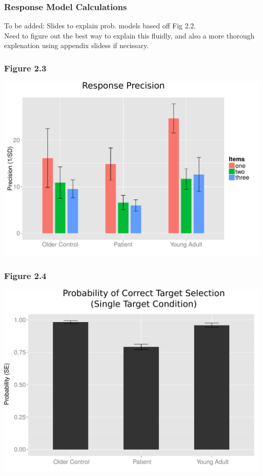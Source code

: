 \documentclass{beamer}
\begin{document}
\begin{frame}
	\frametitle{Response Model Calculations}
	To be added: Slides to explain prob. models based off Fig 2.2.\\
	Need to figure out the best way to explain this fluidly, and also a more thorough
	explenation using appendix slidess if necissary.
\end{frame}


\end{document}
